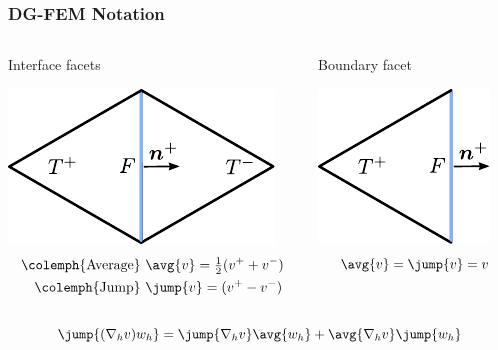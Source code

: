 \begin{frame}
  \frametitle{DG-FEM Notation}
  \begin{columns}[t]
    \begin{column}{0.6\textwidth}
      \begin{block}{Interface facets}
        \begin{center}
          \includegraphics[scale=1.0]{pdf/dg-terms-interface.pdf}
          \\
          \vspace{-2em}
          \begin{alignat*}{2}
              \text{\colemph{Average} } &\avg{v} = \tfrac{1}{2}(v^+ + v^-)
            \\
            \text{\colemph{Jump} }      &\jump{v} = (v^+ - v^-)
          \end{alignat*}
        \end{center}
      \end{block}
    \end{column}
    \begin{column}{0.4\textwidth}
      \begin{block}{Boundary facet}
        \begin{center}
          \includegraphics[scale=1.0]{pdf/dg-terms-boundary.pdf}
          \\
          \vspace{-2em}
          \[
            \avg{v} = \jump{v} = v
          \]
        \end{center}
      \end{block}
    \end{column}
  \end{columns}
  {}
  \begin{equation*}
    \jump{(\nabla_h v) w_h } = \jump{\nabla_h v} \avg{w_h} 
    + \avg{\nabla_h v} \jump{w_h}
  \end{equation*}
\end{frame}
